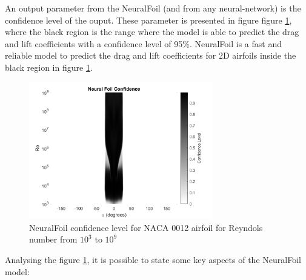An output parameter from the NeuralFoil (and from any neural-network) is the confidence level of the ouput. These parameter is presented in figure figure \ref{fig:neuralfoil_confidence}, where the black region is the range where the model is able to predict the drag and lift coefficients with a confidence level of 95\%. NeuralFoil \cite{sharpe_neuralfoil_nodate} is a fast and reliable model to predict the drag and lift coefficients for 2D airfoils inside the black region in figure \ref{fig:neuralfoil_confidence}.

\begin{figure}[!htb]
    \centering
    \includegraphics[width=8cm]{Figures/background/aero/NeuralFoil_Confidence_2D_black.png}
    \caption{NeuralFoil confidence level for NACA 0012 airfoil for Reyndols number from $10^3$ to $10^9$}
    \label{fig:neuralfoil_confidence}
\end{figure}

Analysing the figure \ref{fig:neuralfoil_confidence}, it is possible to state some key aspects of the NeuralFoil model:

